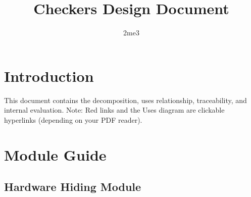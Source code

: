 \documentclass[10pt]{article}
\title{\bf Checkers Design Document}
\author{2me3}
\date{}
\begin{document}
\maketitle

\tableofcontents

\section{Introduction}
    This document contains the decomposition, uses relationship, traceability, and internal evaluation.
    Note: Red links and the Uses diagram are clickable hyperlinks (depending on your PDF reader).
    
\section{Module Guide}

\subsection{Hardware Hiding Module}
\iffalse
    \begin{tikzpicture}[scale=1.5, align=center]
        \node[root] {Hardware Hiding Module}
        child {node[level 2, hyperlink node=mod:Board]{Wireless Communications}}
        child {node[level 2, hyperlink node=mod:Piece]{Clock}}
        child {node[level 2]{Positioning the nodes}}
        child {node[level 2]{Positioning the nodes}
            child[subA] {node[level 3]{Joe}}
            child[subB] {node[level 3]{Heather}}
            child[subC] {node[level 3]{Barbara}}}
        child {node[level 2]{Positioning the nodes}
            child[subA] {node[level 3]{Joe}}
            child[subB] {node[level 3]{Heather}}
            child[subC] {node[level 3]{Barbara}}}
        child {node[level 2]{Positioning the nodes}
            child[subA] {node[level 3]{Joe}}
            child[subB] {node[level 3]{Heather}}
            child[subC] {node[level 3]{Barbara}}}
        child {node[level 2]{Positioning the nodes}
            child[subA] {node[level 3]{Joe}}
            child[subB] {node[level 3]{Heather}}
            child[subC] {node[level 3]{Barbara}}}
        ;
    \end{tikzpicture}
\fi
    
\end{document}
